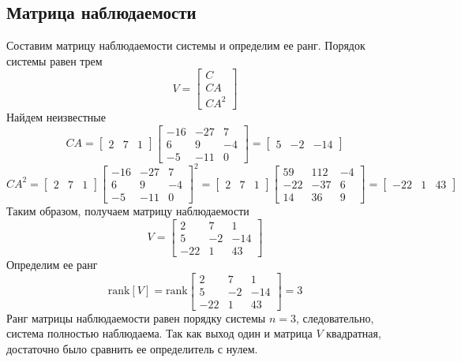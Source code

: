 \documentclass[a4paper, 12pt]{article}
\begin{document}
    \subsection{Матрица наблюдаемости}
    Составим матрицу наблюдаемости системы и определим ее ранг. Порядок системы равен трем
    $$
    V=\begin{bmatrix}
        C\\
        CA\\
        CA^2
    \end{bmatrix}
    $$
    Найдем неизвестные
    $$
    CA=\begin{bmatrix}
        2 &7 &1
    \end{bmatrix}\begin{bmatrix}
        -16 &-27 &7\\
        6 &9 &-4\\
        -5 &-11 &0
    \end{bmatrix}=\begin{bmatrix}
    5 &-2 &-14
    \end{bmatrix}
    $$
    $$
    CA^2=\begin{bmatrix}
        2 &7 &1
    \end{bmatrix}\begin{bmatrix}
        -16 &-27 &7\\
        6 &9 &-4\\
        -5 &-11 &0
    \end{bmatrix}^2=\begin{bmatrix}
        2 &7 &1
    \end{bmatrix}
    \begin{bmatrix}
    59   &112    &-4\\
   -22   &-37     &6\\
    14    &36     &9
    \end{bmatrix}=\begin{bmatrix}
        -22     &1    &43
    \end{bmatrix}
    $$
    Таким образом, получаем матрицу наблюдаемости
    $$
    V=\begin{bmatrix}
    2     &7     &1\\
    5    &-2   &-14\\
   -22     &1    &43
    \end{bmatrix}
    $$
    Определим ее ранг
    $$
    \text{rank}\left[V\right]=\text{rank}\begin{bmatrix}
        2     &7     &1\\
        5    &-2   &-14\\
       -22     &1    &43
    \end{bmatrix}=3
    $$
    Ранг матрицы наблюдаемости равен порядку системы $n=3$, следовательно, система полностью наблюдаема.
    Так как выход один и матрица $V$ квадратная, достаточно было сравнить ее определитель с нулем.
\end{document}
